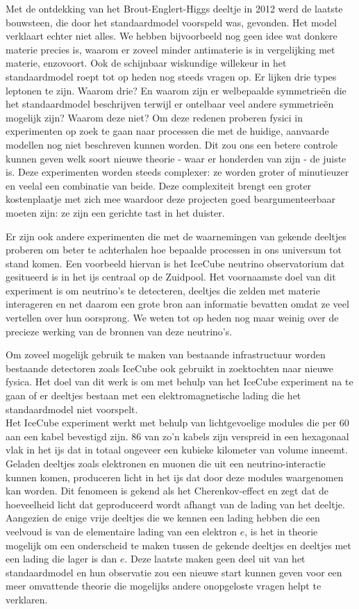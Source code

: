 \noindent Met de ontdekking van het Brout-Englert-Higgs deeltje in 2012 werd de laatste bouwsteen, die door het standaardmodel voorspeld was, gevonden. Het model verklaart echter niet alles. We hebben bijvoorbeeld nog geen idee wat donkere materie precies is, waarom er zoveel minder antimaterie is in vergelijking met materie, enzovoort. Ook de schijnbaar wiskundige willekeur in het standaardmodel roept tot op heden nog steeds vragen op. Er lijken drie types leptonen te zijn. Waarom drie? En waarom zijn er welbepaalde symmetrie\"en die het standaardmodel beschrijven terwijl er ontelbaar veel andere symmetrie\"en mogelijk zijn? Waarom deze niet? Om deze redenen proberen fysici in experimenten op zoek te gaan naar processen die met de huidige, aanvaarde modellen nog niet beschreven kunnen worden. Dit zou ons een betere controle kunnen geven welk soort nieuwe theorie - waar er honderden van zijn - de juiste is. Deze experimenten worden steeds complexer: ze worden groter of minutieuzer en veelal een combinatie van beide. Deze complexiteit brengt een groter kostenplaatje met zich mee waardoor deze projecten goed beargumenteerbaar moeten zijn: ze zijn een gerichte tast in het duister.

Er zijn ook andere experimenten die met de waarnemingen van gekende deeltjes proberen om beter te achterhalen hoe bepaalde processen in ons universum tot stand komen. Een voorbeeld hiervan is het IceCube neutrino observatorium dat gesitueerd is in het ijs centraal op de Zuidpool. Het voornaamste doel van dit experiment is om neutrino's te detecteren, deeltjes die zelden met materie interageren en net daarom een grote bron aan informatie bevatten omdat ze veel vertellen over hun oorsprong. We weten tot op heden nog maar weinig over de precieze werking van de bronnen van deze neutrino's.

Om zoveel mogelijk gebruik te maken van bestaande infrastructuur worden bestaande detectoren zoals IceCube ook gebruikt in zoektochten naar nieuwe fysica. Het doel van dit werk is om met behulp van het IceCube experiment na te gaan of er deeltjes bestaan met een elektromagnetische lading die het standaardmodel niet voorspelt.\\

\noindent Het IceCube experiment werkt met behulp van lichtgevoelige modules die per 60 aan een kabel bevestigd zijn. 86 van zo'n kabels zijn verspreid in een hexagonaal vlak in het ijs dat in totaal ongeveer een kubieke kilometer van volume inneemt. Geladen deeltjes zoals elektronen en muonen die uit een neutrino-interactie kunnen komen, produceren licht in het ijs dat door deze modules waargenomen kan worden. Dit fenomeen is gekend als het Cherenkov-effect en zegt dat de hoeveelheid licht dat geproduceerd wordt afhangt van de lading van het deeltje. Aangezien de enige vrije deeltjes die we kennen een lading hebben die een veelvoud is van de elementaire lading van een elektron $e$, is het in theorie mogelijk om een onderscheid te maken tussen de gekende deeltjes en deeltjes met een lading die lager is dan $e$. Deze laatste maken geen deel uit van het standaardmodel en hun observatie zou een nieuwe start kunnen geven voor een meer omvattende theorie die mogelijks andere onopgeloste vragen helpt te verklaren.\\

